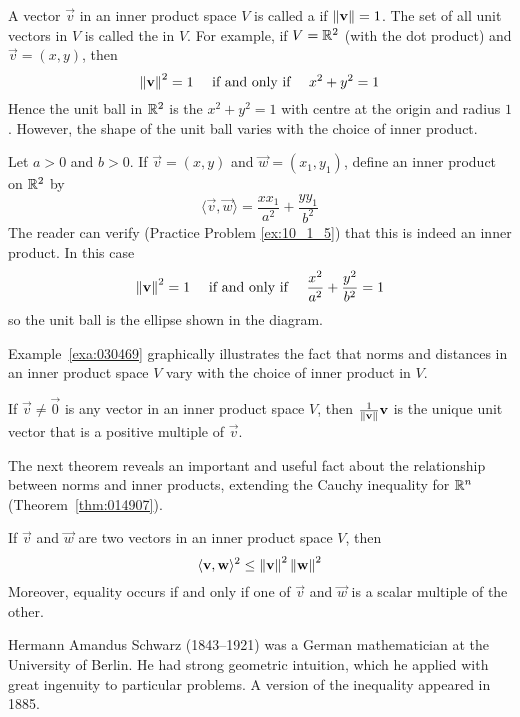 \documentclass{ximera}
\begin{document}
A vector $\vec{v}$ in an inner product space $V$ is called a  if $\left\lVert\mathbf{v}\right\rVert = 1$. The set of all unit vectors in $V$ is called the  in $V$. For example, if $V = \mathbb{R}^2$ (with the dot product) and $\vec{v} = (x, y)$, then
\begin{equation*}
\left\lVert \mathbf{v} \right\rVert^2 = 1 \quad \mbox{ if and only if } \quad x^2 + y^2 = 1
\end{equation*}
Hence the unit ball in $\mathbb{R}^2$ is the  $x^{2} + y^{2} = 1$ with centre at the origin and radius $1$. However, the shape of the unit ball varies with the choice of inner product.

\begin{example}\label{030469}


Let $a > 0$ and $b > 0$. If $\vec{v} = (x, y)$ and $\vec{w} = (x_{1}, y_{1})$, define an inner product on $\mathbb{R}^2$ by
\begin{equation*}
\langle \vec{v}, \vec{w} \rangle = \frac{xx_1}{a^2} + \frac{yy_1}{b^2}
\end{equation*}
The reader can verify (Practice Problem \ref{ex:10_1_5}) that this is indeed an inner product. In this case
\begin{equation*}
\left\lVert \mathbf{v} \right\rVert^2 = 1 \quad \mbox{ if and only if } \quad \frac{x^2}{a^2} + \frac{y^2}{b^2} = 1
\end{equation*}
so the unit ball is the ellipse shown in the diagram.
\end{example}

\noindent Example~\ref{exa:030469} graphically illustrates the fact that norms and distances in an inner product space $V$ vary with the choice of inner product in $V$.

\begin{theorem}\label{030480}
If $\vec{v} \neq \vec{0}$ is any vector in an inner product space $V$, then $\frac{1}{\left\lVert \mathbf{v} \right\rVert} \mathbf{v}$ is the unique unit vector that is a positive multiple of $\vec{v}$.
\end{theorem}

The next theorem reveals an important and useful fact about the relationship between norms and inner products, extending the Cauchy inequality for $\mathbb{R}^n$ (Theorem~\ref{thm:014907}).

\begin{theorem}\label{030486}
If $\vec{v}$ and $\vec{w}$ are two vectors in an inner product space $V$, then
\begin{equation*}
\langle \mathbf{v}, \mathbf{w} \rangle^2 \leq \left\lVert \mathbf{v} \right\rVert^2 \left\lVert \mathbf{w} \right\rVert^2
\end{equation*}
Moreover, equality occurs if and only if one of $\vec{v}$ and $\vec{w}$ is a scalar multiple of the other.
\end{theorem}
\begin{remark}
   Hermann Amandus Schwarz (1843--1921) was a German mathematician at the University of Berlin. He had strong geometric intuition, which he applied with great ingenuity to particular problems. A version of the inequality appeared in 1885. 
\end{remark}
\end{document}
